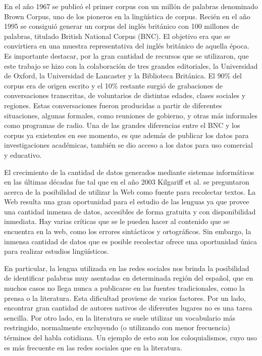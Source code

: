 En el año 1967 se publicó el primer corpus con un millón de palabras denominado Brown Corpus, uno de los pioneros en la lingüística de corpus. Recién en el año 1995 se consiguió generar un corpus del inglés británico con 100 millones de palabras, titulado British National Corpus (BNC). 
El objetivo era que se convirtiera en una muestra representativa del inglés británico de aquella época. 
Es importante destacar, por la gran cantidad de recursos que se utilizaron, que este trabajo se hizo con la colaboración de tres grandes editoriales, la Universidad de Oxford, la Universidad de Lancaster y la Biblioteca Británica. 
El 90\% del corpus era de origen escrito y el 10\% restante surgió de grabaciones de conversaciones transcritas, de voluntarios de distintas edades, clases sociales y regiones. 
Estas conversaciones fueron producidas a partir de diferentes situaciones, algunas formales, como reuniones de gobierno, y otras más informales como programas de radio. 
Una de las grandes diferencias entre el BNC y los corpus ya existentes en ese momento, es que además de publicar los datos para investigaciones académicas, también se dio acceso a los datos para uso comercial y educativo.

El crecimiento de la cantidad de datos generados mediante sistemas informáticos en las últimas décadas fue tal que en el año 2003 Kilgariff et al. \cite{kilgarriff2003introduction} se preguntaron acerca de la posibilidad de utilizar la Web como fuente para recolectar textos.
La Web resulta una gran oportunidad para el estudio de las lenguas ya que provee una cantidad inmensa de datos, accesibles de forma gratuita y con disponibilidad inmediata. Hay varias críticas que se le pueden hacer al contenido que se encuentra en la web, como los errores sintácticos y ortográficos. Sin embargo, la inmensa cantidad de datos que es posible recolectar ofrece una oportunidad única para realizar estudios lingüísticos.

En particular, la lengua utilizada en las redes sociales nos brinda la posibilidad de identificar palabras muy asentadas en determinada región del español, que en muchos casos no llega nunca a publicarse en las fuentes tradicionales, como la prensa o la literatura. Esta dificultad proviene de varios factores. Por un lado, encontrar gran cantidad de autores nativos de diferentes lugares no es una tarea sencilla. Por otro lado, en la literatura se suele utilizar un vocabulario más restringido, normalmente excluyendo (o utilizando con menor frecuencia) términos del habla cotidiana. Un ejemplo de esto son los coloquialismos, cuyo uso es más frecuente en las redes sociales que en la literatura. 

